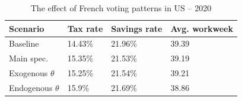 \begin{table}[!htb]
\centering
\begin{threeparttable}
\caption{The effect of French voting patterns in US -- 2020}
\label{table:US_ESC:voting}
\renewcommand{\arraystretch}{1.25}
\begin{tabularx}{.9\textwidth}{lYYY}
\toprule
\textbf{Scenario} & \textbf{Tax rate} & \textbf{Savings rate} & \textbf{Avg. workweek}\\
\midrule 
Baseline & 14.43\% & 21.96\% & 39.39 \\
Main spec. & 15.35\% & 21.53\% & 39.19 \\
Exogenous $\theta$ & 15.25\% & 21.54\% & 39.21 \\
Endogenous $\theta$ & 15.9\% & 21.69\% & 38.86 \\
\bottomrule
\end{tabularx}
\end{threeparttable}
\end{table}